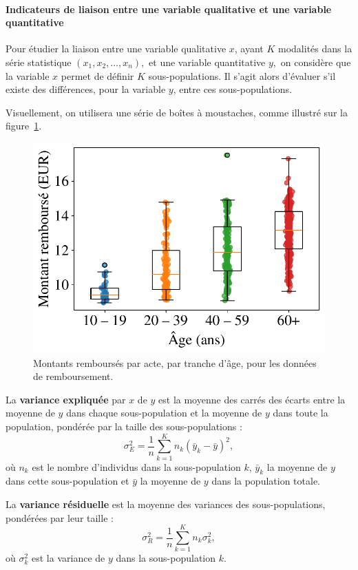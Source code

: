 \paragraph{Indicateurs de liaison entre une variable qualitative et une variable quantitative}
Pour étudier la liaison entre une variable qualitative $x$, ayant $K$ modalités dans la série statistique $(x_1, x_2, \dots, x_n),$ et une
variable quantitative $y,$ on considère que la variable $x$ permet de définir
$K$ sous-populations. Il s'agit alors d'évaluer s'il existe des différences,
pour la variable $y$, entre ces sous-populations.

Visuellement, on utilisera une série de boîtes à moustaches, comme illustré sur
la figure~\ref{fig:remboursement_rembourses_age}.

\begin{figure}[h]
	\centering
	\includegraphics[width=.5\textwidth]{figures/stats/remboursement_rembourses_age}
	\caption{Montants remboursés par acte, par tranche d'âge, pour les données de
		remboursement.}
	\label{fig:remboursement_rembourses_age}
\end{figure}

La \textbf{variance expliquée} par $x$ de $y$ est la moyenne des carrés des écarts
entre la moyenne de $y$ dans chaque sous-population et la moyenne de $y$ dans
toute la population, pondérée par la taille des sous-populations :
\[
\sigma_E^2 = \frac1n \sum_{k=1}^K n_k (\bar{y}_k - \bar{y})^2,
\]
où $n_k$ est le nombre d'individus dans la sous-population $k$, $\bar{y}_k$ la moyenne de $y$ dans cette sous-population et $\bar{y}$
la moyenne de $y$ dans la population totale.

La \textbf{variance résiduelle} est la moyenne des variances des
sous-populations, pondérées par leur taille :
\[
\sigma_R^2 = \frac1n \sum_{k=1}^K n_k \sigma_k^2, 
\]
où $\sigma_k^2$
est la variance de $y$ dans la sous-population $k$.


